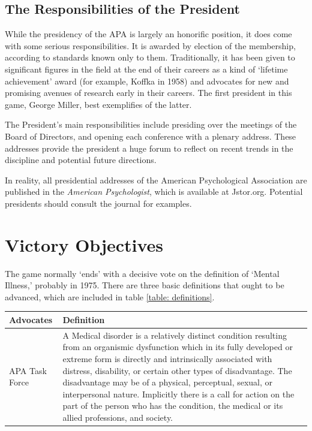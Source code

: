 \begin{refsection}
\subsection{The Responsibilities of the President}
\label{theresponsibilitiesofthepresident}

While the presidency of the APA is largely an honorific position, it does come with some serious responsibilities. It is awarded by election of the membership, according to standards known only to them. Traditionally, it has been given to significant figures in the field at the end of their careers as a kind of `lifetime achievement' award (for example, Koffka in 1958) and advocates for new and promising avenues of research early in their careers. The first president in this game, George Miller, best exemplifies of the latter.

The President's main responsibilities include presiding over the meetings of the Board of Directors, and opening each conference with a plenary address. These addresses provide the president a huge forum to reflect on recent trends in the discipline and potential future directions.

In reality, all presidential addresses of the American Psychological Association are published in the \emph{American Psychologist}, which is available at Jstor.org. Potential presidents should consult the journal for examples.

\section{Victory Objectives}
\label{victoryobjectives}

The game normally `ends' with a decisive vote on the definition of `Mental Illness,' probably in 1975. There are three basic definitions that ought to be advanced, which are included in table \ref{table: definitions}.
 \begin{longtable}[!t]{ | p{2cm} | p{12cm} | }
\hline

\textbf{Advocates}&\textbf{Definition}\\ \hline
APA Task Force&A Medical disorder is a relatively distinct condition resulting from an organismic dysfunction which in its fully developed or extreme form is directly and intrinsically associated with distress, disability, or certain other types of disadvantage.  The disadvantage may be of a physical, perceptual, sexual, or interpersonal nature. Implicitly there is a call for action on the part of the person who has the condition, the medical or its allied professions, and society.


\end{longtable}
\end{refsection}
